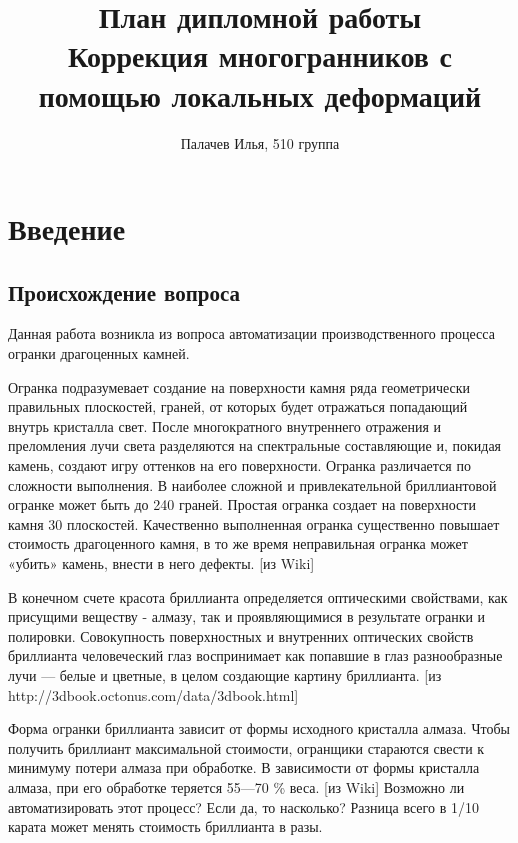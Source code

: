 \documentclass[a4paper,12pt, titlepage]{article}
\title{План дипломной работы\\
Коррекция многогранников с помощью локальных деформаций}
\author{Палачев Илья, 510 группа}
\begin{document}
\maketitle
\tableofcontents


\section{Введение}
\subsection{Происхождение вопроса}
\begin{flushleft}
Данная работа возникла из вопроса автоматизации производственного процесса огранки драгоценных 
камней. 
\end{flushleft}
\begin{flushleft}
Огранка подразумевает создание на поверхности камня ряда геометрически правильных плоскостей, 
граней, от которых будет отражаться попадающий внутрь кристалла свет. После многократного 
внутреннего отражения и преломления лучи света разделяются на спектральные составляющие и, 
покидая камень, создают игру оттенков на его поверхности.
Огранка различается по сложности выполнения. В наиболее сложной и привлекательной бриллиантовой 
огранке может быть до 240 граней. Простая огранка создает на поверхности камня 30 плоскостей.
Качественно выполненная огранка существенно повышает стоимость драгоценного камня, в то же 
время неправильная огранка может «убить» камень, внести в него дефекты. [из Wiki]
\end{flushleft}
\begin{flushleft}
В конечном счете красота бриллианта определяется оптическими свойствами, как присущими 
веществу - алмазу, так и проявляющимися в результате огранки и полировки. Совокупность 
поверхностных и внутренних оптических свойств бриллианта человеческий глаз воспринимает 
как попавшие в глаз разнообразные лучи — белые и цветные, в целом создающие картину 
бриллианта. [из http://3dbook.octonus.com/data/3dbook.html]
\end{flushleft}
\begin{flushleft}
 Форма огранки бриллианта зависит от формы исходного кристалла алмаза. Чтобы получить 
бриллиант максимальной стоимости, огранщики стараются свести к минимуму потери алмаза при обработке. 
В зависимости от формы кристалла алмаза, при его обработке теряется 55—70 \% веса. [из Wiki]
Возможно ли автоматизировать этот процесс? Если да, то насколько? Разница всего в 1/10 карата
может менять стоимость бриллианта в разы.
\end{flushleft}
\end{document}
